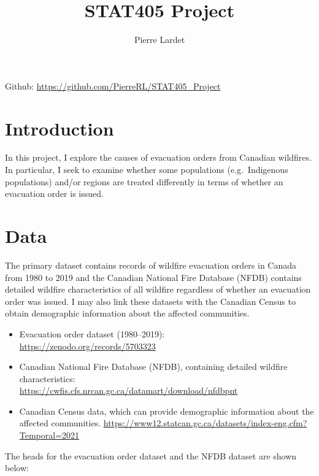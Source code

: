 \documentclass[11pt]{article}
\title{STAT405 Project}
\author{Pierre Lardet}
\date{}
\begin{document}
\maketitle

\noindent Github: \url{https://github.com/PierreRL/STAT405_Project}

\section{Introduction}

In this project, I explore the causes of evacuation orders from Canadian wildfires. In particular, I seek to examine whether some populations (e.g.\ Indigenous populations) and/or regions are treated differently in terms of whether an evacuation order is issued.

\section{Data}

The primary dataset contains records of wildfire evacuation orders in Canada from 1980 to 2019 and the Canadian National Fire Database (NFDB) contains detailed wildfire characteristics of all wildfire regardless of whether an evacuation order was issued. I may also link these datasets with the Canadian Census to obtain demographic information about the affected communities.

\begin{itemize}
\item Evacuation order dataset (1980--2019): \\
\url{https://zenodo.org/records/5703323}

\item Canadian National Fire Database (NFDB), containing detailed wildfire characteristics: \\
\url{https://cwfis.cfs.nrcan.gc.ca/datamart/download/nfdbpnt}

\item Canadian Census data, which can provide demographic information about the affected communities. \url{https://www12.statcan.gc.ca/datasets/index-eng.cfm?Temporal=2021}
\end{itemize}

The heads for the evacuation order dataset and the NFDB dataset are shown below:

\begin{table}[h]
\centering
{}
\caption{Example row from the wildfire evacuation order dataset.}
\end{table}
\end{document}
